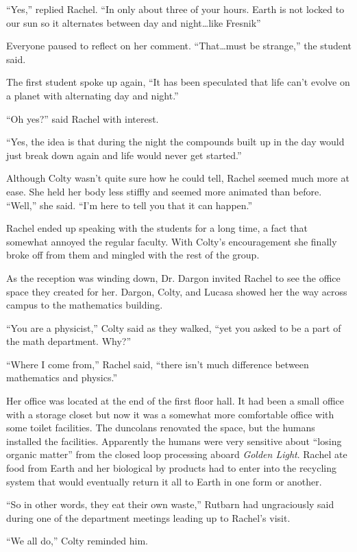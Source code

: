 ``Yes,'' replied Rachel. ``In only about three of your hours. Earth is not locked to our sun so
it alternates between day and night\ldots like Fresnik''

Everyone paused to reflect on her comment. ``That\ldots must be strange,'' the student said.

The first student spoke up again, ``It has been speculated that life can't evolve on a planet
with alternating day and night.''

``Oh yes?'' said Rachel with interest.

``Yes, the idea is that during the night the compounds built up in the day would just break down
again and life would never get started.''

Although Colty wasn't quite sure how he could tell, Rachel seemed much more at ease. She held
her body less stiffly and seemed more animated than before. ``Well,'' she said. ``I'm here to
tell you that it can happen.''

Rachel ended up speaking with the students for a long time, a fact that somewhat annoyed the
regular faculty. With Colty's encouragement she finally broke off from them and mingled with the
rest of the group.

As the reception was winding down, Dr. Dargon invited Rachel to see the office space they
created for her. Dargon, Colty, and Lucasa showed her the way across campus to the mathematics
building.

``You are a physicist,'' Colty said as they walked, ``yet you asked to be a part of the math
department. Why?''

``Where I come from,'' Rachel said, ``there isn't much difference between mathematics and
physics.''

Her office was located at the end of the first floor hall. It had been a small office with a
storage closet but now it was a somewhat more comfortable office with some toilet facilities.
The duncolans renovated the space, but the humans installed the facilities. Apparently the
humans were very sensitive about ``losing organic matter'' from the closed loop processing
aboard \textit{Golden Light}. Rachel ate food from Earth and her biological by products had to
enter into the recycling system that would eventually return it all to Earth in one form or
another.

``So in other words, they eat their own waste,'' Rutbarn had ungraciously said during one of the
department meetings leading up to Rachel's visit.

``We all do,'' Colty reminded him.

